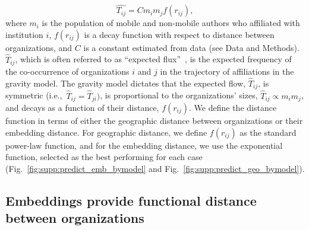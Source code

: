 \documentclass[12pt]{article} %
\def\ie{i.e.,~}
\begin{document}
\begin{equation}
	\label{eq:gravity_basic}
	\hat{T_{ij}} = Cm_{i}m_{j}f(r_{ij}),
\end{equation}
where $m_{i}$ is the population of mobile and non-mobile authors who affiliated with institution $i$, $f(r_{ij})$ is a decay function with respect to distance between organizations, and $C$ is a constant estimated from data (see Data and Methods). 
$\hat{T}_{ij}$, which is often referred to as ``expected flux''~\autocite{simini2012universal}, is the expected frequency of the co-occurrence of organizations $i$ and $j$ in the trajectory of affiliations in the gravity model.
The gravity model dictates that the expected flow, $\hat{T}_{ij}$, is symmetric (\ie $\hat{T}_{ij }= \hat{T}_{ji})$, is proportional to the organizations' sizes, $\hat{T}_{ij} \propto m_{i} m_{j}$, and decays as a function of their distance, $f(r_{ij})$. 
We define the distance function in terms of either the geographic distance between organizations or their embedding distance.
For geographic distance, we define $f(r_{ij})$ as the standard power-law function, and for the embedding distance, we use the exponential function, selected as the best performing for each case (Fig.~\ref{fig:supp:predict_emb_bymodel} and Fig.~\ref{fig:supp:predict_geo_bymodel}).


%
%
%
\subsection*{Embeddings provide functional distance between organizations}
\end{document}
